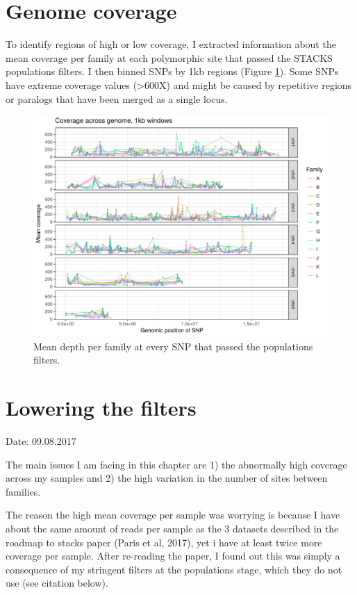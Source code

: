 \documentclass[10pt,a4paper]{report}
\begin{document}
\section{Genome coverage}

To identify regions of high or low coverage, I extracted information about the mean coverage per family at each polymorphic site that passed the STACKS populations filters. I then binned SNPs by 1kb regions (Figure \ref{cov_genome}).
Some SNPs have extreme coverage values (>600X) and might be caused by repetitive regions or paralogs that have been merged as a single locus.

\begin{figure}[h]
	\begin{center}
		\includegraphics[width=\textwidth]{coverage_analysis/coverage_1kbwin.pdf}
		\caption{Mean depth per family at every SNP that passed the populations filters.}
		\label{cov_genome}
	\end{center}
\end{figure}

\section{Lowering the filters}

Date: 09.08.2017

The main issues I am facing in this chapter are 1) the abnormally high coverage across my samples and 2) the high variation in the number of sites between families.

The reason the high mean coverage per sample was worrying is because I have about the same amount of reads per sample as the 3 datasets described in the roadmap to stacks paper (Paris et al, 2017), yet i have at least twice more coverage per sample. After re-reading the paper, I found out this was simply a consequence of my stringent filters at the populations stage, which they do not use (see citation below).\\
\end{document}
